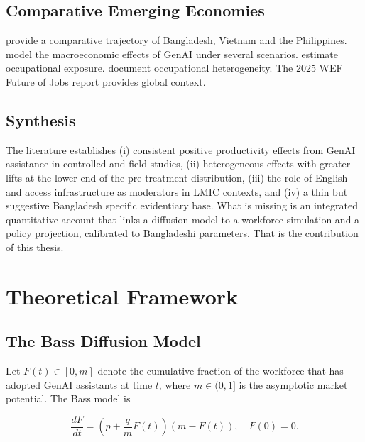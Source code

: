 \documentclass[11pt,a4paper]{report}
\begin{document}
\section{Comparative Emerging Economies}

\citet{ParveenRaza2024} provide a comparative trajectory of Bangladesh,
Vietnam and the Philippines. \citet{AcemogluRestrepo2024} model the
macroeconomic effects of GenAI under several scenarios.
\citet{Eloundou2024GPTsAreGPTs} estimate occupational exposure.
\citet{FelteEtAl2024} document occupational heterogeneity. The 2025
WEF Future of Jobs report \citep{WEFFutureOfJobs2025} provides global
context.

\section{Synthesis}

The literature establishes (i) consistent positive productivity effects
from GenAI assistance in controlled and field studies, (ii) heterogeneous
effects with greater lifts at the lower end of the pre-treatment
distribution, (iii) the role of English and access infrastructure as
moderators in LMIC contexts, and (iv) a thin but suggestive Bangladesh
specific evidentiary base. What is missing is an integrated quantitative
account that links a diffusion model to a workforce simulation and a
policy projection, calibrated to Bangladeshi parameters. That is the
contribution of this thesis.

\chapter{Theoretical Framework}

\section{The Bass Diffusion Model}

Let $F(t) \in [0, m]$ denote the cumulative fraction of the workforce
that has adopted GenAI assistants at time $t$, where $m \in (0, 1]$ is
the asymptotic market potential. The Bass model is

\begin{equation}
\frac{dF}{dt} = \left(p + \frac{q}{m} F(t)\right)\left(m - F(t)\right),
\quad F(0) = 0.
\label{eq:bass}
\end{equation}
\end{document}
